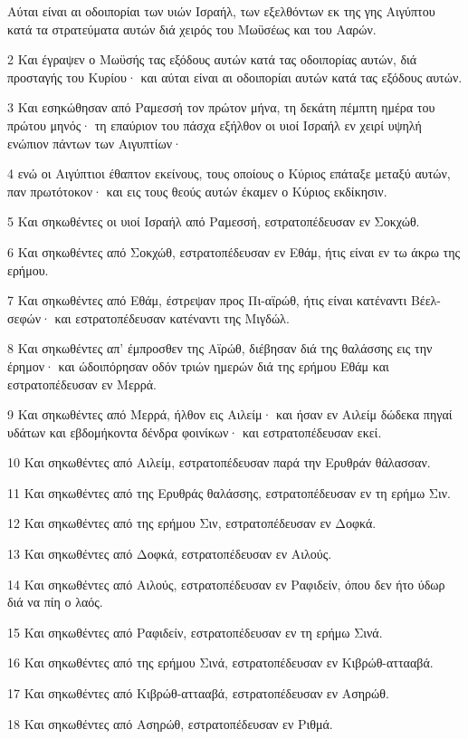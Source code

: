 \par Αύται είναι αι οδοιπορίαι των υιών Ισραήλ, των εξελθόντων εκ της γης Αιγύπτου κατά τα στρατεύματα αυτών διά χειρός του Μωϋσέως και του Ααρών.
\par 2 Και έγραψεν ο Μωϋσής τας εξόδους αυτών κατά τας οδοιπορίας αυτών, διά προσταγής του Κυρίου· και αύται είναι αι οδοιπορίαι αυτών κατά τας εξόδους αυτών.
\par 3 Και εσηκώθησαν από Ραμεσσή τον πρώτον μήνα, τη δεκάτη πέμπτη ημέρα του πρώτου μηνός· τη επαύριον του πάσχα εξήλθον οι υιοί Ισραήλ εν χειρί υψηλή ενώπιον πάντων των Αιγυπτίων·
\par 4 ενώ οι Αιγύπτιοι έθαπτον εκείνους, τους οποίους ο Κύριος επάταξε μεταξύ αυτών, παν πρωτότοκον· και εις τους θεούς αυτών έκαμεν ο Κύριος εκδίκησιν.
\par 5 Και σηκωθέντες οι υιοί Ισραήλ από Ραμεσσή, εστρατοπέδευσαν εν Σοκχώθ.
\par 6 Και σηκωθέντες από Σοκχώθ, εστρατοπέδευσαν εν Εθάμ, ήτις είναι εν τω άκρω της ερήμου.
\par 7 Και σηκωθέντες από Εθάμ, έστρεψαν προς Πι-αϊρώθ, ήτις είναι κατέναντι Βέελ-σεφών· και εστρατοπέδευσαν κατέναντι της Μιγδώλ.
\par 8 Και σηκωθέντες απ' έμπροσθεν της Αϊρώθ, διέβησαν διά της θαλάσσης εις την έρημον· και ώδοιπόρησαν οδόν τριών ημερών διά της ερήμου Εθάμ και εστρατοπέδευσαν εν Μερρά.
\par 9 Και σηκωθέντες από Μερρά, ήλθον εις Αιλείμ· και ήσαν εν Αιλείμ δώδεκα πηγαί υδάτων και εβδομήκοντα δένδρα φοινίκων· και εστρατοπέδευσαν εκεί.
\par 10 Και σηκωθέντες από Αιλείμ, εστρατοπέδευσαν παρά την Ερυθράν θάλασσαν.
\par 11 Και σηκωθέντες από της Ερυθράς θαλάσσης, εστρατοπέδευσαν εν τη ερήμω Σιν.
\par 12 Και σηκωθέντες από της ερήμου Σιν, εστρατοπέδευσαν εν Δοφκά.
\par 13 Και σηκωθέντες από Δοφκά, εστρατοπέδευσαν εν Αιλούς.
\par 14 Και σηκωθέντες από Αιλούς, εστρατοπέδευσαν εν Ραφιδείν, όπου δεν ήτο ύδωρ διά να πίη ο λαός.
\par 15 Και σηκωθέντες από Ραφιδείν, εστρατοπέδευσαν εν τη ερήμω Σινά.
\par 16 Και σηκωθέντες από της ερήμου Σινά, εστρατοπέδευσαν εν Κιβρώθ-αττααβά.
\par 17 Και σηκωθέντες από Κιβρώθ-αττααβά, εστρατοπέδευσαν εν Ασηρώθ.
\par 18 Και σηκωθέντες από Ασηρώθ, εστρατοπέδευσαν εν Ριθμά.
